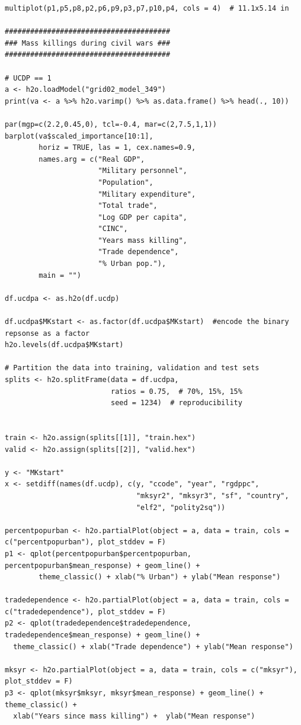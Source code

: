 \documentclass[a4paper,12pt]{article}
\begin{document}
\begin{verbatim}
multiplot(p1,p5,p8,p2,p6,p9,p3,p7,p10,p4, cols = 4)  # 11.1x5.14 in

#######################################
### Mass killings during civil wars ###
#######################################

# UCDP == 1
a <- h2o.loadModel("grid02_model_349")
print(va <- a %>% h2o.varimp() %>% as.data.frame() %>% head(., 10)) 

par(mgp=c(2.2,0.45,0), tcl=-0.4, mar=c(2,7.5,1,1))
barplot(va$scaled_importance[10:1],
        horiz = TRUE, las = 1, cex.names=0.9,
        names.arg = c("Real GDP",
                      "Military personnel",
                      "Population",
                      "Military expenditure",
                      "Total trade",
                      "Log GDP per capita",
                      "CINC",
                      "Years mass killing",
                      "Trade dependence",
                      "% Urban pop."),
        main = "")

df.ucdpa <- as.h2o(df.ucdp)

df.ucdpa$MKstart <- as.factor(df.ucdpa$MKstart)  #encode the binary repsonse as a factor
h2o.levels(df.ucdpa$MKstart)

# Partition the data into training, validation and test sets
splits <- h2o.splitFrame(data = df.ucdpa, 
                         ratios = 0.75,  # 70%, 15%, 15%
                         seed = 1234)  # reproducibility


train <- h2o.assign(splits[[1]], "train.hex")   
valid <- h2o.assign(splits[[2]], "valid.hex") 

y <- "MKstart"
x <- setdiff(names(df.ucdp), c(y, "ccode", "year", "rgdppc",
                               "mksyr2", "mksyr3", "sf", "country",
                               "elf2", "polity2sq")) 

percentpopurban <- h2o.partialPlot(object = a, data = train, cols = c("percentpopurban"), plot_stddev = F)
p1 <- qplot(percentpopurban$percentpopurban, percentpopurban$mean_response) + geom_line() +
        theme_classic() + xlab("% Urban") + ylab("Mean response")

tradedependence <- h2o.partialPlot(object = a, data = train, cols = c("tradedependence"), plot_stddev = F)
p2 <- qplot(tradedependence$tradedependence, tradedependence$mean_response) + geom_line() +
  theme_classic() + xlab("Trade dependence") + ylab("Mean response")

mksyr <- h2o.partialPlot(object = a, data = train, cols = c("mksyr"), plot_stddev = F)
p3 <- qplot(mksyr$mksyr, mksyr$mean_response) + geom_line() + theme_classic() + 
  xlab("Years since mass killing") +  ylab("Mean response")


\end{verbatim}
\end{document}

